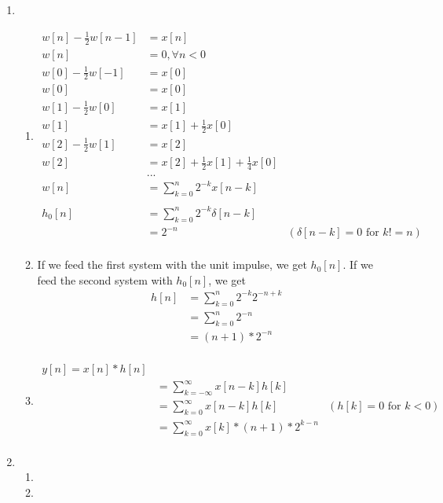 \documentclass[10pt,a4paper, margin=1in]{article}
\begin{document}
\begin{enumerate}
\item %
    \begin{enumerate}
    \item %
    \begin{align*}
        w[n] - \frac{1}{2}w[n - 1] & = x[n]\\
        w[n] & = 0,  \forall n < 0 \\
        w[0] - \frac{1}{2}w[-1] & = x[0]\\
        w[0] & = x[0]\\
        w[1] - \frac{1}{2}w[0] & = x[1]\\
        w[1] & = x[1] + \frac{1}{2}x[0]\\
        w[2] - \frac{1}{2}w[1] & = x[2]\\
        w[2] & = x[2] + \frac{1}{2}x[1] + \frac{1}{4}x[0]\\
        &...\\
        w[n] & = \sum_{k = 0}^{n} 2^{-k}x[n - k]\\
        & \\
        h_0[n] & = \sum_{k = 0}^{n} 2^{-k}\delta[n - k]\\
        & = 2^{-n} & (\delta[n-k] = 0 \text{ for } k != n)\\
    \end{align*}
    \item
    If we feed the first system with the unit impulse, we get $h_0[n]$. If we feed the second system with $h_0[n]$, we get
    \begin{align*}
        h[n] &= \sum_{k = 0}^{n} 2^{-k}2^{-n+k} \\
        &= \sum_{k = 0}^{n} 2^{-n} \\
        &= (n+1) * 2^{-n} \\
    \end{align*}
    \item \begin{align*}
        y[n] = x[n] * h[n] \\
        &= \sum_{k = -\infty}^{\infty} x[n-k]h[k] \\
        &= \sum_{k = 0}^{\infty} x[n-k]h[k] & (h[k] = 0 \text{ for } k < 0)\\
        &= \sum_{k = 0}^{\infty} x[k]*(n+1) * 2^{k-n} \\
    \end{align*}
    \end{enumerate}
    
\item %
    \begin{enumerate}
    \item %
    \item %
    \end{enumerate}    

\end{enumerate}
\end{document}
